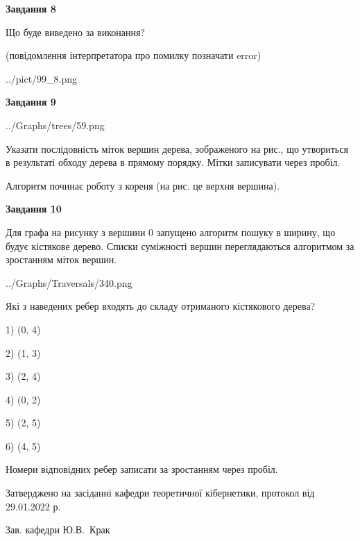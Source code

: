 \documentclass[12pt, ukrainian]{article}
\begin{document}
{\begin {large}
{\begin {center}\textbf{Завдання 8}\end {center}}\par
Що буде виведено за виконання?\par
 (повідомлення інтерпретатора про помилку позначати error)\par
\begin{center}
	{../pict/99_8.png}
\end{center}
\newpage

{\begin {center}\textbf{Завдання 9}\end {center}}\par

\begin{center}
	{../Graphs/trees/59.png}
\end{center}
Указати послідовність міток вершин дерева, зображеного на рис., що утвориться в результаті обходу дерева в прямому порядку. Мітки записувати через пробіл.\par Алгоритм починає роботу з кореня (на рис. це верхня вершина).\par
\newpage

{\begin {center}\textbf{Завдання 10}\end {center}}\par
Для графа на рисунку з вершини 0 запущено алгоритм пошуку в ширину, що будує кістякове дерево. Списки суміжності вершин переглядаються алгоритмом за зростанням міток вершин.\par
\begin{center}
	{../Graphs/Traversals/340.png}
\end{center}
\par Які з наведених ребер входять до складу отриманого кістякового дерева?\par
1) (0, 4)\par
2) (1, 3)\par
3) (2, 4)\par
4) (0, 2)\par
5) (2, 5)\par
6) (4, 5)\par
{\vskip 15pt} Номери відповідних ребер записати за зростанням через пробіл.\par
\newpage


\end {large}
}
{\smallskip \begin {small} Затверджено на засіданні кафедри теоретичної кібернетики, протокол  від   29.01.2022 р.\par\smallskip\smallskip
{\parbox {6.5 cm}{Зав. кафедри \dotfill Ю.В.~Крак}} \end{small}}
\end{document}
